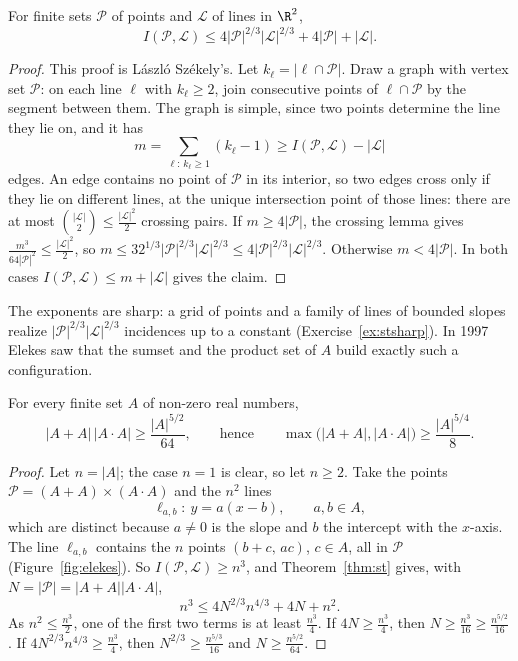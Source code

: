 \begin{theorem}\label{thm:st}
For finite sets $\mathcal P$ of points and $\mathcal L$ of lines in $\R^2$,
\[
I(\mathcal P,\mathcal L)\le4|\mathcal P|^{2/3}|\mathcal L|^{2/3}+4|\mathcal P|+|\mathcal L|.
\]
\end{theorem}
\begin{proof}
This proof is László Székely's. Let $k_\ell=|\ell\cap\mathcal P|$. Draw a graph with vertex set $\mathcal P$: on each line $\ell$ with $k_\ell\ge2$, join consecutive points of $\ell\cap\mathcal P$ by the segment between them. The graph is simple, since two points determine the line they lie on, and it has
\[
m=\sum_{\ell:\,k_\ell\ge1}(k_\ell-1)\ge I(\mathcal P,\mathcal L)-|\mathcal L|
\]
edges. An edge contains no point of $\mathcal P$ in its interior, so two edges cross only if they lie on different lines, at the unique intersection point of those lines: there are at most $\binom{|\mathcal L|}2\le\frac{|\mathcal L|^2}2$ crossing pairs. If $m\ge4|\mathcal P|$, the crossing lemma gives $\frac{m^3}{64|\mathcal P|^2}\le\frac{|\mathcal L|^2}2$, so $m\le32^{1/3}|\mathcal P|^{2/3}|\mathcal L|^{2/3}\le4|\mathcal P|^{2/3}|\mathcal L|^{2/3}$. Otherwise $m<4|\mathcal P|$. In both cases $I(\mathcal P,\mathcal L)\le m+|\mathcal L|$ gives the claim.
\end{proof}

The exponents are sharp: a grid of points and a family of lines of bounded slopes realize $|\mathcal P|^{2/3}|\mathcal L|^{2/3}$ incidences up to a constant (Exercise~\ref{ex:stsharp}). In 1997 Elekes saw that the sumset and the product set of $A$ build exactly such a configuration.

\begin{theorem}[Elekes, 1997]\label{thm:elekes}
For every finite set $A$ of non-zero real numbers,
\[
|A+A|\,|A\cdot A|\ge\frac{|A|^{5/2}}{64},\qquad\text{hence}\qquad\max\bigl(|A+A|,|A\cdot A|\bigr)\ge\frac{|A|^{5/4}}8.
\]
\end{theorem}
\begin{proof}
Let $n=|A|$; the case $n=1$ is clear, so let $n\ge2$. Take the points $\mathcal P=(A+A)\times(A\cdot A)$ and the $n^2$ lines
\[
\ell_{a,b}:\ y=a(x-b),\qquad a,b\in A,
\]
which are distinct because $a\neq0$ is the slope and $b$ the intercept with the $x$-axis. The line $\ell_{a,b}$ contains the $n$ points $(b+c,\,ac)$, $c\in A$, all in $\mathcal P$ (Figure~\ref{fig:elekes}). So $I(\mathcal P,\mathcal L)\ge n^3$, and Theorem~\ref{thm:st} gives, with $N=|\mathcal P|=|A+A||A\cdot A|$,
\[
n^3\le4N^{2/3}n^{4/3}+4N+n^2.
\]
As $n^2\le\frac{n^3}2$, one of the first two terms is at least $\frac{n^3}4$. If $4N\ge\frac{n^3}4$, then $N\ge\frac{n^3}{16}\ge\frac{n^{5/2}}{16}$. If $4N^{2/3}n^{4/3}\ge\frac{n^3}4$, then $N^{2/3}\ge\frac{n^{5/3}}{16}$ and $N\ge\frac{n^{5/2}}{64}$.
\end{proof}

